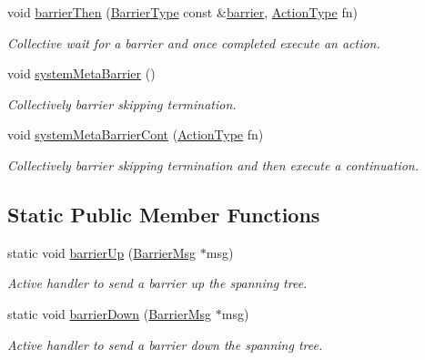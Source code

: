 \begin{DoxyCompactItemize}
void \hyperlink{structvt_1_1collective_1_1barrier_1_1_barrier_a3f1be86145f4b0fe20d6ffd67a285e53}{barrier\+Then} (\hyperlink{namespacevt_a25e481f0d6bbc7204db23d1c87a62e77}{Barrier\+Type} const \&\hyperlink{structvt_1_1collective_1_1barrier_1_1_barrier_a05124050c7d353a4f3475ee1875dd46a}{barrier}, \hyperlink{namespacevt_ae0a5a7b18cc99d7b732cb4d44f46b0f3}{Action\+Type} fn)
\begin{DoxyCompactList}\small\item\em Collective wait for a barrier and once completed execute an action. \end{DoxyCompactList}\item 
void \hyperlink{structvt_1_1collective_1_1barrier_1_1_barrier_a31b7fc393348cd50a9beac2372aabd79}{system\+Meta\+Barrier} ()
\begin{DoxyCompactList}\small\item\em Collectively barrier skipping termination. \end{DoxyCompactList}\item 
void \hyperlink{structvt_1_1collective_1_1barrier_1_1_barrier_ad3c1ad5f531262cfebcfd4295db341d4}{system\+Meta\+Barrier\+Cont} (\hyperlink{namespacevt_ae0a5a7b18cc99d7b732cb4d44f46b0f3}{Action\+Type} fn)
\begin{DoxyCompactList}\small\item\em Collectively barrier skipping termination and then execute a continuation. \end{DoxyCompactList}\end{DoxyCompactItemize}
\subsection*{Static Public Member Functions}
\begin{DoxyCompactItemize}
\item 
static void \hyperlink{structvt_1_1collective_1_1barrier_1_1_barrier_ab229e28e7dea8c0dcdaf07b13173984d}{barrier\+Up} (\hyperlink{structvt_1_1collective_1_1barrier_1_1_barrier_msg}{Barrier\+Msg} $\ast$msg)
\begin{DoxyCompactList}\small\item\em Active handler to send a barrier up the spanning tree. \end{DoxyCompactList}\item 
static void \hyperlink{structvt_1_1collective_1_1barrier_1_1_barrier_a81c35871762c47ea8901fe70ac9b8082}{barrier\+Down} (\hyperlink{structvt_1_1collective_1_1barrier_1_1_barrier_msg}{Barrier\+Msg} $\ast$msg)
\begin{DoxyCompactList}\small\item\em Active handler to send a barrier down the spanning tree. \end{DoxyCompactList}\end{DoxyCompactItemize}
